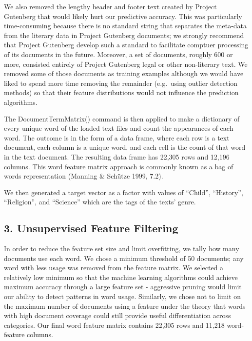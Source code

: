 \documentclass[12pt,]{article}
\begin{document}
We also removed the lengthy header and footer text created by Project
Gutenberg that would likely hurt our predictive accuracy. This was
particularly time-consuming because there is no standard string that
separates the meta-data from the literary data in Project Gutenberg
documents; we strongly recommend that Project Gutenberg develop such a
standard to facilitate comptuer processing of its documents in the
future. Moreover, a set of documents, roughly 600 or more, consisted
entirely of Project Gutenberg legal or other non-literary text. We
removed some of those documents as training examples although we would
have liked to spend more time removing the remainder (e.g.~using outlier
detection methods) so that their feature distributions would not
influence the prediction algorithms.

The DocumentTermMatrix() command is then applied to make a dictionary of
every unique word of the loaded text files and count the appearances of
each word. The outcome is in the form of a data frame, where each row is
a text document, each column is a unique word, and each cell is the
count of that word in the text document. The resulting data frame has
22,305 rows and 12,196 columns. This word feature matrix approach is
commonly known as a bag of words representation (Manning \& Schütze
1999, 7.2).

We then generated a target vector as a factor with values of ``Child'',
``History'', ``Religion'', and ``Science'' which are the tags of the
texts' genre.

\subsection{{3. Unsupervised Feature
Filtering}}\label{unsupervised-feature-filtering}

In order to reduce the feature set size and limit overfitting, we tally
how many documents use each word. We chose a minimum threshold of 50
documents; any word with less usage was removed from the feature matrix.
We selected a relatively low minimum so that the machine learning
algorithms could achieve maximum accuracy through a large feature set -
aggressive pruning would limit our ability to detect patterns in word
usage. Similarly, we chose not to limit on the maximum number of
documents using a feature under the theory that words with high document
coverage could still provide useful differentiation across categories.
Our final word feature matrix contains 22,305 rows and 11,218
word-feature columns.
\end{document}
